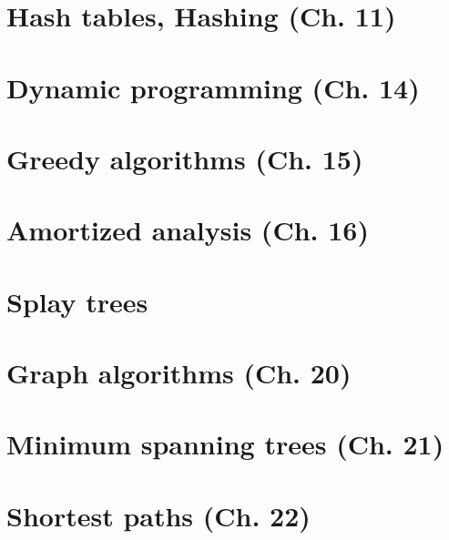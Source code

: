 \documentclass{article}
\begin{document}

\section{Hash tables, Hashing (Ch. 11)}

\newpage


\section{Dynamic programming (Ch. 14)}

\newpage


\section{Greedy algorithms (Ch. 15)} %

\newpage


\section{Amortized analysis (Ch. 16)}

\newpage

\section{Splay trees}

\newpage


\section{Graph algorithms (Ch. 20)}

\newpage


\section{Minimum spanning trees (Ch. 21)}

\newpage


\section{Shortest paths (Ch. 22)}

\newpage
\end{document}
